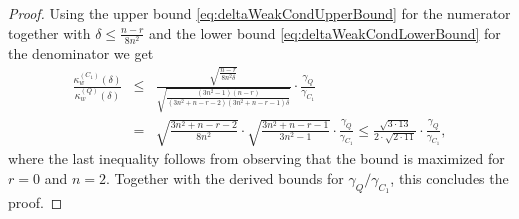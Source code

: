 \documentclass[12pt]{article}
\newtheorem{remark}[theorem]{Remark}
\begin{document}
\begin{proof}
    Using the upper bound \eqref{eq:deltaWeakCondUpperBound} for the numerator together with
    $\delta \leq \frac{n-r}{8n^2}$
    and the lower bound \eqref{eq:deltaWeakCondLowerBound} for the denominator we get
    \begin{eqnarray*}
    \frac{\kappa^{(C_1)}_w(\delta)}{\kappa^{(Q)}_w(\delta)}
         &\leq& \frac{\sqrt{\frac{n-r}{8n^2 \delta}}}{{\sqrt{\frac{(3n^2-1)(n-r)}{(3n^2+n-r-2)(3n^2+n-r-1)\delta}}}}\cdot \frac{\gamma_Q}{\gamma_{C_1}} \\
         &=& \sqrt{\frac{3n^2+n-r-2}{8n^2}}\cdot \sqrt{\frac{3n^2+n-r-1}{3n^2-1}} \cdot \frac{\gamma_Q}{\gamma_{C_1}}\le \frac{ \sqrt{3 \cdot 13} }{2\cdot\sqrt{2\cdot 11}} \cdot \frac{\gamma_Q}{\gamma_{C_1}},
    \end{eqnarray*}
    where the last inequality follows from observing that the bound is maximized for $r = 0$ and $n = 2$. Together with the derived bounds for $\gamma_Q/\gamma_{C_1}$, this concludes the proof.
\end{proof}
\end{document}
